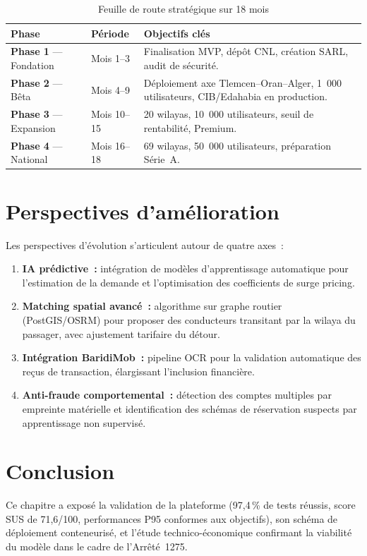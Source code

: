 \begin{table}[H]
\centering
\footnotesize
\begin{tabularx}{\textwidth}{|l|l|X|}
\hline
\rowcolor{rohlight}
\textbf{Phase} & \textbf{Période} & \textbf{Objectifs clés} \\
\hline
\textbf{Phase 1} --- Fondation & Mois 1--3 & Finalisation MVP, dépôt CNL, création SARL, audit de sécurité. \\
\hline
\textbf{Phase 2} --- Bêta & Mois 4--9 & Déploiement axe Tlemcen--Oran--Alger, 1~000 utilisateurs, CIB/Edahabia en production. \\
\hline
\textbf{Phase 3} --- Expansion & Mois 10--15 & 20 wilayas, 10~000 utilisateurs, seuil de rentabilité, Premium. \\
\hline
\textbf{Phase 4} --- National & Mois 16--18 & 69 wilayas, 50~000 utilisateurs, préparation Série~A. \\
\hline
\end{tabularx}
  \caption{Feuille de route stratégique sur 18 mois}
  \label{tab:roadmap}
\end{table}


\section{Perspectives d'amélioration}
\label{sec:perspectives-amelioration}

Les perspectives d'évolution s'articulent autour de quatre axes~:
\begin{enumerate}
  \item \textbf{IA prédictive~:} intégration de modèles d'apprentissage automatique pour l'estimation de la demande et l'optimisation des coefficients de surge pricing.
  \item \textbf{Matching spatial avancé~:} algorithme sur graphe routier (PostGIS/OSRM) pour proposer des conducteurs transitant par la wilaya du passager, avec ajustement tarifaire du détour.
  \item \textbf{Intégration BaridiMob~:} pipeline OCR pour la validation automatique des reçus de transaction, élargissant l'inclusion financière.
  \item \textbf{Anti-fraude comportemental~:} détection des comptes multiples par empreinte matérielle et identification des schémas de réservation suspects par apprentissage non supervisé.
\end{enumerate}

\section{Conclusion}

Ce chapitre a exposé la validation de la plateforme (97,4\,\% de tests réussis, score SUS de 71,6/100, performances P95 conformes aux objectifs), son schéma de déploiement conteneurisé, et l'étude technico-économique confirmant la viabilité du modèle dans le cadre de l'Arrêté~1275.
